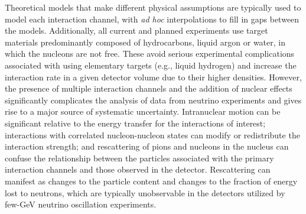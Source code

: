 \documentclass{ar-1col}
\begin{document}
Theoretical models that make different physical assumptions are typically used to model each interaction channel, with {\it ad hoc} interpolations to fill in gaps between the models.
Additionally, all current and planned experiments use target materials predominantly composed of hydrocarbons, liquid argon or water, in which the nucleons are not free. These avoid serious experimental complications associated with using elementary targets (e.g., liquid hydrogen) and increase the interaction rate in a given detector volume due to their higher densities.
However, the presence of multiple interaction channels and the addition of nuclear effects significantly complicates the analysis of data from neutrino experiments and gives rise to a major source of systematic uncertainty.
Intranuclear motion can be significant relative to the energy transfer for the interactions of interest;
interactions with correlated nucleon-nucleon states can modify or redistribute the interaction strength;
and rescattering of pions and nucleons in the nucleus can confuse the relationship between the particles associated with the primary interaction channels and those observed in the detector.
Rescattering can manifest as changes to the particle content and changes to the fraction of energy lost to neutrons, which are typically unobservable in the detectors utilized by few-GeV neutrino oscillation experiments.
\end{document}

